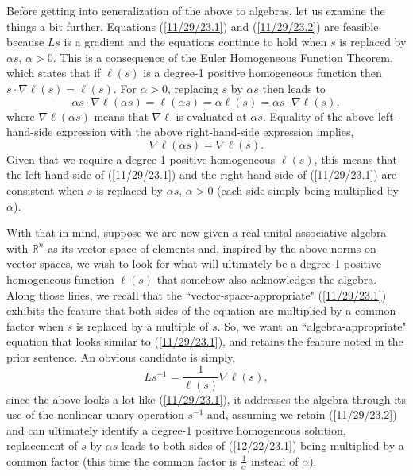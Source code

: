 \documentclass{amsart}
\numberwithin{equation}{section}
\theoremstyle{definition}
\numberwithin{theorem}{section}
\begin{document}
Before getting into generalization of the above to algebras, let us examine the things a bit further.  Equations (\ref{11/29/23.1}) and (\ref{11/29/23.2}) are feasible because $Ls$ is a gradient and the equations continue to hold when $s$ is replaced by $\alpha s$, $\alpha >0$.  This is a consequence of the Euler Homogeneous Function Theorem, which states that if $\ell(s)$ is a degree-1 positive homogeneous function then
  $s\cdot\nabla \ell(s) = \ell(s)$.  For $\alpha>0$, replacing $s$ by $\alpha s$ then leads to \[ \alpha s \cdot \nabla \ell(\alpha s) = \ell(\alpha s) = \alpha \ell(s) = \alpha s\cdot \nabla \ell(s),\] where $\nabla \ell(\alpha s)$ means that $\nabla \ell$ is evaluated at $\alpha s$. Equality of the above left-hand-side expression with the above right-hand-side expression implies, \begin{equation}\label{11/30/23.5} \nabla \ell(\alpha s) = \nabla \ell(s).\end{equation}    
  Given that we require a degree-1 positive homogeneous $\ell(s)$, this means that the left-hand-side of (\ref{11/29/23.1}) and the right-hand-side of (\ref{11/29/23.1}) are consistent when $s$ is replaced by $\alpha s$, $\alpha>0$ (each side simply being multiplied by $\alpha$).  
  
  With that in mind, suppose we are now given a real unital associative algebra with $\mathbb{R}^n$ as its vector space of elements  and, inspired by the above norms on vector spaces, we wish to look for what will ultimately be a degree-1 positive homogeneous function $\ell(s)$ that somehow also acknowledges the algebra.  Along those lines, we recall that the ``vector-space-appropriate" (\ref{11/29/23.1}) exhibits the feature that both sides of the equation are multiplied by a common factor when $s$ is replaced by a multiple of $s$.  So, we want an ``algebra-appropriate" equation that looks similar to (\ref{11/29/23.1}), and retains the feature noted in the prior sentence.  An obvious candidate is simply, \begin{equation}\label{12/22/23.1} Ls^{-1}=\frac{1}{\ell(s)}\nabla\ell(s),\end{equation} since the above looks a lot like (\ref{11/29/23.1}), it addresses the algebra through its use of the nonlinear unary operation $s^{-1}$ and, assuming we retain (\ref{11/29/23.2}) and can ultimately identify a degree-1 positive homogeneous solution, replacement of $s$ by $\alpha s$ leads to both sides of (\ref{12/22/23.1}) being multiplied by a common factor (this time the common factor is $\frac{1}{\alpha}$ instead of $\alpha$).   
  
\end{document}
